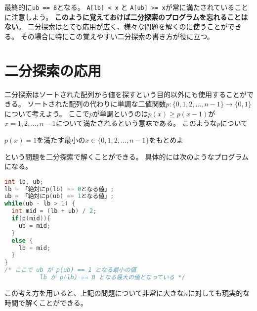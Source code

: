 \documentclass[a4paper,twoside,onecolumn,openany,article,10pt]{memoir}
\theoremstyle{remark}
\begin{document}
\begin{center}
\end{center}

最終的に\texttt{ub == 8}となる。
\texttt{A[lb] < x} と \texttt{A[ub] >= x}が常に満たされていることに注意しよう。
\textbf{このように覚えておけば二分探索のプログラムを忘れることはない}。
二分探索はとても応用が広く、様々な問題を解くのに使うことができる。
その場合に特にこの覚えやすい二分探索の書き方が役に立つ。


\section{二分探索の応用}
二分探索はソートされた配列から値を探すという目的以外にも使用することができる。
ソートされた配列の代わりに単調な二値関数$p\colon \{0,1,2,\dotsc,n-1\}\to\{0,1\}$について考えよう。
ここで$p$が単調というのは$p(x)\ge p(x-1)$が$x=1,2,\dotsc,n-1$について満たされるという意味である。
このような$p$について
\begin{center}
$p(x) = 1$を満たす最小の$x\in\{0,1,2,\dotsc,n-1\}$をもとめよ
\end{center}
という問題を二分探索で解くことができる。
具体的には次のようなプログラムになる。

\begin{minipage}{\linewidth}
\begin{lstlisting}[basicstyle=\ttfamily\normalsize,showstringspaces=false,language=C,frame=single]
int lb, ub;
lb = 「絶対にp(lb) == 0となる値」;
ub = 「絶対にp(ub) == 1となる値」;
while(ub - lb > 1) {
  int mid = (lb + ub) / 2;
  if(p(mid)){
    ub = mid;
  }
  else {
    lb = mid;
  }
}
/* ここで ub が p(ub) == 1 となる最小の値
          lb が p(lb) == 0 となる最大の値となっている */
\end{lstlisting}
\end{minipage}
この考え方を用いると、上記の問題について非常に大きな$n$に対しても現実的な時間で解くことができる。
\end{document}
